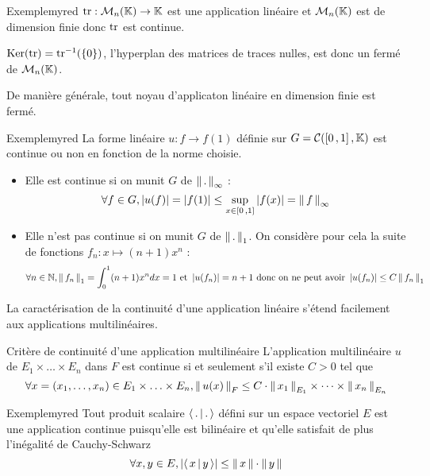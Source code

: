     \begin{omed}{Exemple}{myred}
        $\operatorname{tr} : \mathcal{M}_{n}(\mathbb{K}) \rightarrow \mathbb{K}$ est une application linéaire et $\mathcal{M}_{n}(\mathbb{K})$ est de dimension finie donc $\operatorname{tr}$ est continue.

        $\operatorname{Ker}(\operatorname{tr}) = \operatorname{tr}^{-1}(\{ 0 \})$, l’hyperplan des matrices de traces nulles, est donc un fermé de $\mathcal{M}_{n}(\mathbb{K})$.
    \end{omed}

    De manière générale, tout noyau d’applicaton linéaire en dimension finie est fermé.

    \begin{omed}{Exemple}{myred}
        La forme linéaire $u : f \rightarrow f(1)$ définie sur $G = \mathcal{C}(\left[ 0 \, , 1 \right], \mathbb{K})$ est continue ou non en fonction de la norme choisie.
        \begin{itemize}
            \item Elle est continue si on munit $G$ de $\left\lVert\,.\,\right\rVert_{\infty}$ :
            \[ \forall f \in G, \left\lvert u(f)\right\rvert = \left\lvert f(1)\right\rvert \leq \sup_{x \in \left[ 0 \, , 1 \right]} \left\lvert f(x)\right\rvert = \left\lVert\,f\,\right\rVert_{\infty} \] 
            \item Elle n’est pas continue si on munit $G$ de $\left\lVert\,.\,\right\rVert_1$. On considère pour cela la suite de fonctions $f_n : x \mapsto (n+1)x^n$ : 
            \[ \forall n \in \mathbb{N}, \left\lVert\,f_n\,\right\rVert_1 = \int_{0}^{1} (n+1)x^n dx = 1 \text{ et } \left\lvert u(f_n)\right\rvert = n+1 \text{ donc on ne peut avoir } \left\lvert u(f_n)\right\rvert \leq C \left\lVert\,f_n\,\right\rVert_1 \]
        \end{itemize}
    \end{omed}

    La caractérisation de la continuité d’une application linéaire s’étend facilement aux applications multilinéaires.

    \begin{theo}{Critère de continuité d’une application multilinéaire}{}
        L’application multilinéaire $u$ de $E_1 \times \ldots \times E_n$ dans $F$ est continue si et seulement s’il existe $C > 0$ tel que 
        \[ \forall x = (x_1, \ldots, x_n) \in E_1 \times \ldots \times E_n, \left\lVert\,u(x)\,\right\rVert_F \leq C \cdot \left\lVert\,x_1\,\right\rVert_{E_1} \times \cdots \times \left\lVert\,x_n\,\right\rVert_{E_n} \]
    \end{theo}

    \begin{omed}{Exemple}{myred}
        Tout produit scalaire $\left<\,.\,\middle|\,.\,\right>$ défini sur un espace vectoriel $E$ est une application continue puisqu’elle est bilinéaire et qu’elle satisfait de plus l’inégalité de Cauchy-Schwarz 
        \[ \forall x,y \in E, \left\lvert \left<\,x\,\middle|\,y\,\right>\right\rvert \leq \left\lVert\,x\,\right\rVert \cdot \left\lVert\,y\,\right\rVert \] 
    \end{omed}

